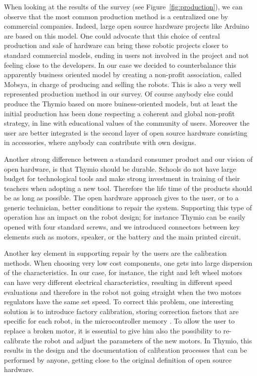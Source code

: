 \documentclass[letterpaper, 10 pt, conference]{ieeeconf}  %
\begin{document}
When looking at the results of the survey (see Figure~\ref{fig:production}), we can observe that the most common production method is a centralized one by commercial companies.
Indeed, large open source hardware projects like Arduino are based on this model.
One could advocate that this choice of central production and sale of hardware can bring these robotic projects closer to standard commercial models, ending in users not involved in the project and not feeling close to the developers.
In our case we decided to counterbalance this apparently business oriented model by creating a non-profit association, called Mobsya, in charge of producing and selling the robots. 
This is also a very well represented production method in our survey.
Of course anybody else could produce the Thymio based on more buiness-oriented models, but at least the initial production has been done respecting a coherent and global non-profit strategy, in line with educational values of the community of users.
Moreover the user are better integrated is the second layer of open source hardware consisting in accessories, where anybody can contribute with own designs.

Another strong difference between a standard consumer product and our vision of open hardware, is that Thymio should be durable.
Schools do not have large budget for technological tools and make strong investment in training of their teachers when adopting a new tool.
Therefore the life time of the products should be as long as possible. 
The open hardware approach gives to the user, or to a generic technician, better conditions to repair the system.
Supporting this type of operation has an impact on the robot design; for instance Thymio can be easily opened with four standard screws, and we introduced connectors between key elements such as motors, speaker, or the battery and the main printed circuit. 

Another key element in supporting repair by the users are the calibration methods. 
When choosing very low cost components, one gets into large dispersion of the characteristics. 
In our case, for instance, the right and left wheel motors can have very different electrical characteristics, resulting in different speed evaluations and therefore in the robot not going straight when the two motors regulators have the same set speed.
To correct this problem, one interesting solution is to introduce factory calibration, storing correction factors that are specific for each robot, in the microcontroller memory . 
To allow the user to replace a broken motor, it is essential to give him also the possibility to re-calibrate the robot and adjust the parameters of the new motors.
In Thymio, this results in the design and the documentation of calibration processes that can be performed by anyone, getting close to the original definition of open source hardware.
\end{document}
